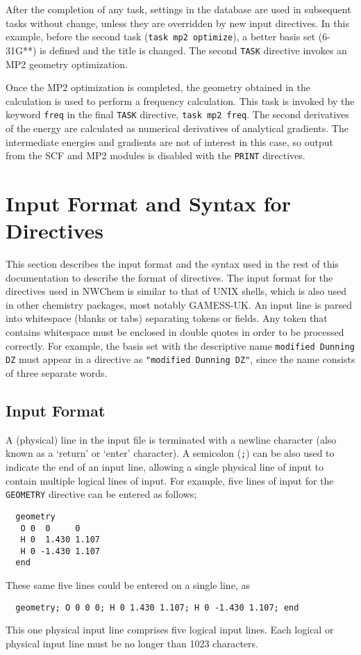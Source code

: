 After the completion of any task, settings in the database are used in
subsequent tasks without change, unless they are overridden by new
input directives.  In this example, before the second task
(\verb+task mp2 optimize+),
 a better basis set (6-31G**) is defined and the title
is changed.  The second {\tt TASK} directive invokes an MP2 geometry
optimization.

Once the MP2 optimization is completed, the geometry obtained in the
calculation is used to perform a frequency calculation.  This task is
invoked by the keyword \verb+freq+ in the final \verb+TASK+ directive,
\verb+task mp2 freq+.  The second derivatives of the energy are
calculated as numerical derivatives of analytical gradients. The
intermediate energies and gradients are not of interest in
this case, so output from the SCF and MP2 modules is disabled with the
\verb+PRINT+ directives.

\section{Input Format and Syntax for Directives}
\label{sec:syntax}

This section describes the input format and the syntax used in the
rest of this documentation to describe the format of directives.  The
input format for the directives used in NWChem is similar to that of
UNIX shells, which is also used in other chemistry packages, most
notably GAMESS-UK.  An input line is parsed into whitespace (blanks or
tabs) separating tokens or fields.  Any token that contains whitespace
must be enclosed in double quotes in order to be processed correctly.
For example, the basis set with the descriptive name
\verb+modified Dunning DZ+ must appear in a directive as
\verb+"modified Dunning DZ"+, since the name consists of three separate words.

\subsection{Input Format}

A (physical) line in the input file is terminated with a newline
character (also known as a `return' or `enter' character).  A
semicolon (\verb+;+) can be also used to indicate the end of an input
line, allowing a single physical line of input to contain multiple
logical lines of input.  For example, five lines of input for the
\verb+GEOMETRY+ directive can be entered as follows;
\begin{verbatim}
  geometry
   O 0  0     0
   H 0  1.430 1.107
   H 0 -1.430 1.107
  end
\end{verbatim}
These same five lines could be entered on a single line, as
\begin{verbatim}
  geometry; O 0 0 0; H 0 1.430 1.107; H 0 -1.430 1.107; end
\end{verbatim}
This one physical input line comprises five logical
input lines.  Each logical or physical input line must be no longer
than 1023 characters.  

